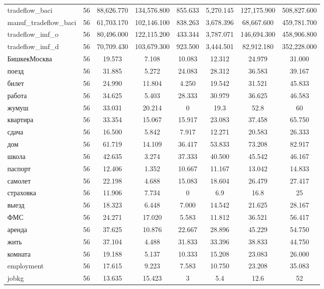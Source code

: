 \begin{table}[!htbp]
\begin{tabular}{@{\extracolsep{5pt}}lccccccc}
tradeflow\_baci & 56 & 88,626.770 & 134,576.800 & 855.633 & 5,270.145 & 127,175.900 & 508,827.600 \\ 
manuf\_tradeflow\_baci & 56 & 61,703.170 & 102,146.100 & 838.263 & 3,678.396 & 68,667.600 & 459,781.700 \\ 
tradeflow\_imf\_o & 56 & 80,496.000 & 122,115.200 & 433.344 & 3,787.071 & 146,694.300 & 458,906.800 \\ 
tradeflow\_imf\_d & 56 & 70,709.430 & 103,679.300 & 923.500 & 3,444.501 & 82,912.180 & 352,228.000 \\ 
БишкекМосква & 56 & 19.573 & 7.108 & 10.083 & 12.312 & 24.979 & 31.000 \\ 
поезд & 56 & 31.885 & 5.272 & 24.083 & 28.312 & 36.583 & 39.167 \\ 
билет & 56 & 24.990 & 11.804 & 4.250 & 19.542 & 31.521 & 45.833 \\ 
работа & 56 & 34.625 & 5.403 & 28.333 & 30.979 & 36.625 & 46.583 \\ 
жумуш & 56 & 33.031 & 20.214 & 0 & 19.3 & 52.8 & 60 \\ 
квартира & 56 & 33.354 & 15.067 & 15.917 & 23.083 & 37.458 & 65.750 \\ 
сдача & 56 & 16.500 & 5.842 & 7.917 & 12.271 & 20.583 & 26.333 \\ 
дом & 56 & 61.719 & 14.109 & 36.417 & 53.833 & 73.208 & 82.917 \\ 
школа & 56 & 42.635 & 3.274 & 37.333 & 40.500 & 45.542 & 46.167 \\ 
паспорт & 56 & 12.406 & 1.352 & 10.667 & 11.167 & 13.042 & 14.833 \\ 
самолет & 56 & 22.198 & 4.688 & 15.083 & 18.604 & 26.479 & 27.417 \\ 
страховка & 56 & 11.906 & 7.734 & 0 & 6.9 & 16.8 & 25 \\ 
выезд & 56 & 18.323 & 6.448 & 7.000 & 14.542 & 21.625 & 28.167 \\ 
ФМС & 56 & 24.271 & 17.020 & 5.583 & 11.812 & 36.521 & 56.417 \\ 
аренда & 56 & 37.625 & 10.876 & 22.667 & 28.896 & 45.229 & 54.750 \\ 
жить & 56 & 37.104 & 4.488 & 31.833 & 33.396 & 38.833 & 44.750 \\ 
комната & 56 & 19.188 & 5.137 & 10.333 & 15.208 & 23.083 & 26.000 \\ 
employment & 56 & 17.615 & 9.223 & 7.583 & 10.750 & 23.208 & 35.083 \\ 
jobkg & 56 & 13.635 & 15.423 & 3 & 5.4 & 12.6 & 52 \\ 

\end{tabular}
\end{table}

